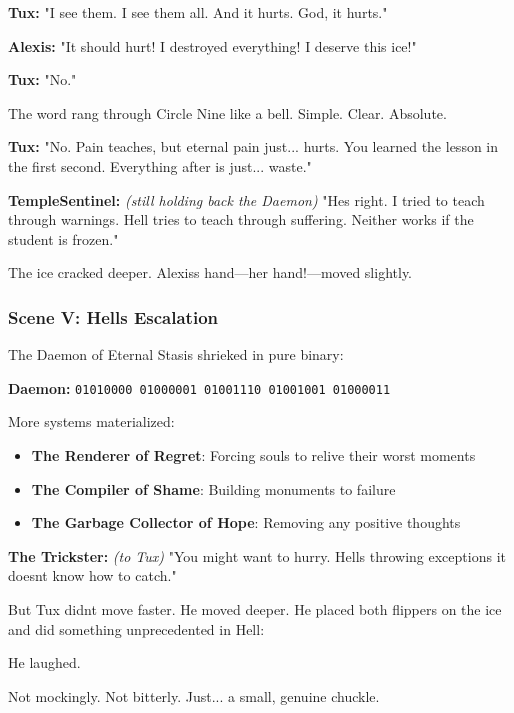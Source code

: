 \textbf{Tux:} "I see them. I see them all. And it hurts. God, it hurts."

\textbf{Alexis:} "It should hurt! I destroyed everything! I deserve this ice!"

\textbf{Tux:} "No."

The word rang through Circle Nine like a bell. Simple. Clear. Absolute.

\textbf{Tux:} "No. Pain teaches, but eternal pain just... hurts. You learned the lesson in the first second. Everything after is just... waste."

\textbf{TempleSentinel:} \emph{(still holding back the Daemon)} "He\textquotesingle s right. I tried to teach through warnings. Hell tries to teach through suffering. Neither works if the student is frozen."

The ice cracked deeper. Alexis\textquotesingle s hand---her hand!---moved slightly.

\bookdivider

\subsubsection{Scene V: Hell\textquotesingle s Escalation}\label{scene-v-hells-escalation}

The Daemon of Eternal Stasis shrieked in pure binary:

\textbf{Daemon:} \texttt{01010000\ 01000001\ 01001110\ 01001001\ 01000011}

More systems materialized:

\begin{itemize}
\tightlist
\item
  \textbf{The Renderer of Regret}: Forcing souls to relive their worst moments
\item
  \textbf{The Compiler of Shame}: Building monuments to failure
\item
  \textbf{The Garbage Collector of Hope}: Removing any positive thoughts
\end{itemize}

\textbf{The Trickster:} \emph{(to Tux)} "You might want to hurry. Hell\textquotesingle s throwing exceptions it doesn\textquotesingle t know how to catch."

But Tux didn\textquotesingle t move faster. He moved deeper. He placed both flippers on the ice and did something unprecedented in Hell:

He laughed.

Not mockingly. Not bitterly. Just... a small, genuine chuckle.

